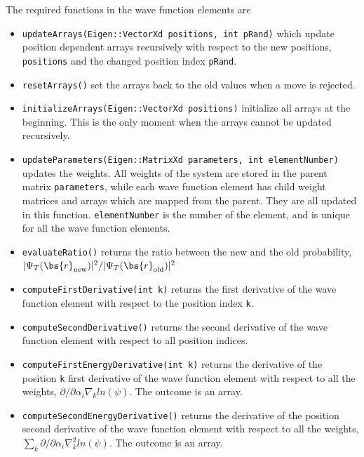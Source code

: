The required functions in the wave function elements are
\begin{itemize}
	\item \lstinline{updateArrays(Eigen::VectorXd positions, int pRand)} which update position dependent arrays recursively with respect to the new positions, \lstinline{positions} and the changed position index \lstinline{pRand}. 
	
	\item \lstinline{resetArrays()} set the arrays back to the old values when a move is rejected.
	
	\item \lstinline{initializeArrays(Eigen::VectorXd positions)} initialize all arrays at the beginning. This is the only moment when the arrays cannot be updated recursively. 
	
	\item \lstinline{updateParameters(Eigen::MatrixXd parameters, int elementNumber)} updates the weights. All weights of the system are stored in the parent matrix \lstinline{parameters}, while each wave function element has child weight matrices and arrays which are mapped from the parent. They are all updated in this function. \lstinline{elementNumber} is the number of the element, and is unique for all the wave function elements.
	
	\item \lstinline{evaluateRatio()} returns the ratio between the new and the old probability, \\ $|\Psi_T(\bs{r}_{\text{new}})|^2/|\Psi_T(\bs{r}_{\text{old}})|^2$
	
	\item \lstinline{computeFirstDerivative(int k)} returns the first derivative of the wave function element with respect to the position index \lstinline{k}.
	
	\item \lstinline{computeSecondDerivative()} returns the second derivative of the wave function element with respect to all position indices. 
	
	\item \lstinline{computeFirstEnergyDerivative(int k)} returns the derivative of the position \lstinline{k} first derivative of the wave function element with respect to all the weights, $\partial/\partial \alpha_i \nabla_k ln(\psi)$. The outcome is an array.
	
	\item \lstinline{computeSecondEnergyDerivative()} returns the derivative of the position second derivative of the wave function element with respect to all the weights, $\sum_k\partial/\partial \alpha_i \nabla_k^2 ln(\psi)$. The outcome is an array.
\end{itemize}

